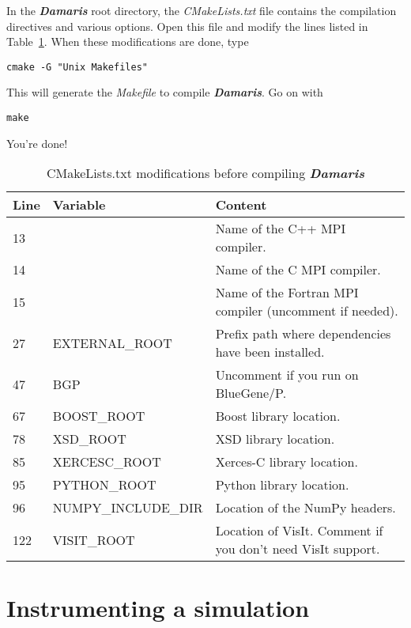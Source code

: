 \documentclass[11pt]{report}
\newcommand{\Damaris}{\emph{\textbf{Damaris}}}
\newcommand{\file}[1]{\emph{#1}}
\begin{document}
In the \Damaris{} root directory, the \file{CMakeLists.txt} file contains the compilation directives
and various options. Open this file and modify the lines listed in Table~\ref{tab:cmake}.
When these modifications are done, type
\begin{verbatim}
cmake -G "Unix Makefiles"
\end{verbatim}
This will generate the \file{Makefile} to compile \Damaris{}. Go on with 
\begin{verbatim}
make
\end{verbatim}
You're done!

\begin{table}
\centering
\begin{tabular}{|l|l|l|}
	\hline
   Line & Variable & Content \\
   \hline
   \hline
   13 &  & Name of the C++ MPI compiler. \\
   14 &  & Name of the C MPI compiler. \\
   15 &  & Name of the Fortran MPI compiler (uncomment if needed). \\
   27 & EXTERNAL\_ROOT & Prefix path where dependencies have been installed. \\
   47 & BGP & Uncomment if you run on BlueGene/P. \\
   67 & BOOST\_ROOT & Boost library location. \\
   78 & XSD\_ROOT & XSD library location. \\
   85 & XERCESC\_ROOT & Xerces-C library location. \\
   95 & PYTHON\_ROOT & Python library location. \\
   96 & NUMPY\_INCLUDE\_DIR & Location of the NumPy headers. \\
   122 & VISIT\_ROOT & Location of VisIt. Comment if you don't need VisIt support. \\
   \hline
\end{tabular}\caption{CMakeLists.txt modifications before compiling \Damaris{}}\label{tab:cmake}
\end{table}



\chapter{Instrumenting a simulation}\label{Instrumenting}
\end{document}
